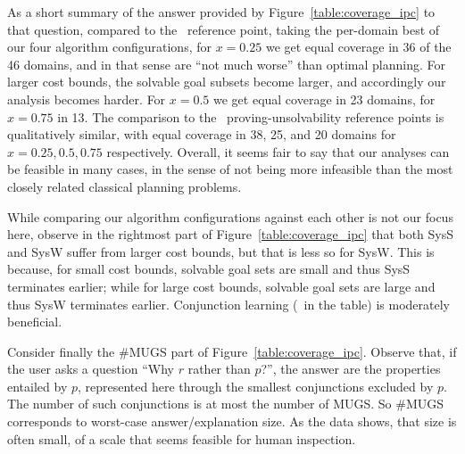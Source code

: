 As a short summary of the answer provided by
Figure~\ref{table:coverage_ipc} to that question, compared to
the \hlmcut\ reference point, taking the per-domain best of our four
algorithm configurations, for $x=0.25$ we get equal coverage in 36 of
the 46 domains, and in that sense are ``not much worse'' than optimal
planning. For larger cost bounds, the solvable goal subsets become
larger, and accordingly our analysis becomes harder. For $x=0.5$ we
get equal coverage in 23 domains, for $x=0.75$ in 13. The comparison
to the \hc\ proving-unsolvability reference points is qualitatively
similar, with equal coverage in 38, 25, and 20 domains for $x=0.25,
0.5, 0.75$ respectively. Overall, it seems fair to say that our
analyses can be feasible in many cases, in the sense of not being more
infeasible than the most closely related classical planning problems.

While comparing our algorithm configurations against each other is not
our focus here, observe in the rightmost part of
Figure~\ref{table:coverage_ipc} that both SysS and SysW suffer from
larger cost bounds, but that is less so for SysW. This is because, for
small cost bounds, solvable goal sets are small and thus SysS
terminates earlier; while for large cost bounds, solvable goal sets
are large and thus SysW terminates earlier. Conjunction learning (\hc\
in the table) is moderately beneficial.
%
%

Consider finally the \#MUGS part of
Figure~\ref{table:coverage_ipc}. Observe that, if the user asks a
question ``Why $r$ rather than $p$?'', the answer are the properties
entailed by $p$, represented here through the smallest conjunctions
excluded by $p$. The number of such conjunctions is at most the number
of MUGS. So \#MUGS corresponds to worst-case answer/explanation
size. As the data shows, that size is often small, of a scale that
seems feasible for human inspection. 
%

